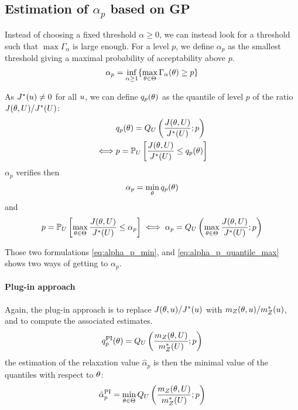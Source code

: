 \documentclass[../../Main_ManuscritThese.tex]{subfiles}
\begin{document}
\subsection{Estimation of $\alpha_p$ based on GP}
Instead of choosing a fixed threshold $\alpha \geq 0$, we can instead look for a threshold such that $\max \Gamma_{\alpha}$ is large enough.
For a level $p$, we define $\alpha_p$ as the smallest threshold giving a maximal probability of acceptability above $p$.
\begin{equation}
  \alpha_p = \inf_{\alpha \geq 1}\{\max_{\theta \in \Theta}\Gamma_{\alpha}(\theta)\geq p \}
\end{equation}

As $J^*(u) \neq 0$ for all $u$, we can define $q_{p}(\theta)$ as the quantile of level $p$ of the ratio $J(\theta, U) / J^*(U)$:
\begin{align}
       & q_{p}(\theta) = Q_{U}\left(\frac{J(\theta, U)}{J^*(U)};p\right) \\
  \iff &p          = \mathbb{P}_{U}\left[\frac{J(\theta, U)}{J^*(U)} \leq q_{p}(\theta)\right]
\end{align}
$\alpha_p$ verifies then
\begin{equation}
  \label{eq:alpha_p_min}
\alpha_p = \min_{\theta} q_p(\theta)
\end{equation}
and 
\begin{equation}
  \label{eq:alpha_p_quantile_max}
  p = \mathbb{P}_{U}\left[\max_{\theta \in \Theta}\frac{J(\theta, U)}{J^*(U)} \leq \alpha_p\right] \iff \alpha_p = Q_{U}\left(\max_{\theta\in\Theta} \frac{J(\theta,U)}{J^*(U)};p\right)
\end{equation}

Those two formulations \cref{eq:alpha_p_min}, and \cref{eq:alpha_p_quantile_max} shows two ways of getting to $\alpha_p$.
\paragraph{Plug-in approach}
Again, the plug-in approach is to replace $J(\theta, u)/J^*(u)$ with $m_Z(\theta, u) / m^*_Z(u)$, and to compute the associated estimates.
\begin{equation}
  q_{p}^{\mathrm{PI}}(\theta) = Q_{U}\left(\frac{m_Z(\theta, U)}{m^*_Z(U)};p\right)
\end{equation}
the estimation of the relaxation value $\hat{\alpha}_p$ is then the minimal value of the quantiles with respect to $\theta$:
\begin{equation}
    \label{eq:def_plugin_alpha}
  \hat{\alpha}^{\mathrm{PI}}_p = \min_{\kk \in \Kspace} Q_U\left(\frac{m_Z(\kk, \UU)}{m^*_Z(\UU)};p\right) %
\end{equation}
\end{document}
